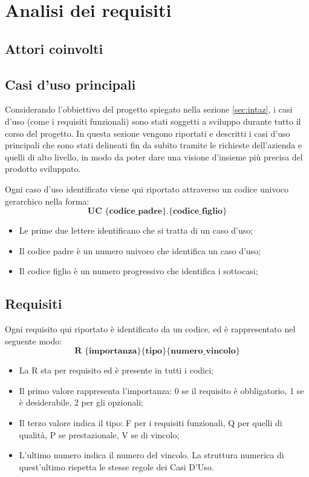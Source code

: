 
\chapter{Analisi dei requisiti}\label{chap:requirements}

\section{Attori coinvolti}
\section{Casi d'uso principali}
Considerando l'obbiettivo del progetto spiegato nella sezione \ref{sec:intaz}, i casi d'uso (come i requisiti funzionali) sono stati soggetti a sviluppo durante tutto il corso del progetto. In questa sezione vengono riportati e descritti i casi d'uso principali che sono stati delineati fin da subito tramite le richieste dell'azienda e quelli di alto livello, in modo da poter dare una visione d’insieme più precisa del prodotto sviluppato.

Ogni caso d'uso identificato viene qui riportato attraverso un codice univoco gerarchico nella forma:
$$ \textbf{UC \{codice\_padre\}.\{codice\_figlio\}  } $$
\begin{itemize}
	\item Le prime due lettere identificano che si tratta di un caso d'uso;
	\item Il codice padre è un numero univoco che identifica un caso d'uso;
	\item Il codice figlio è un numero progressivo che identifica i sottocasi;\\
\end{itemize}



\section{Requisiti}
Ogni requisito qui riportato è identificato da un codice, ed è rappresentato nel seguente modo:
$$ \textbf{R \{importanza\}\{tipo\}\{numero\_vincolo\} } $$

\begin{itemize}
	\item La R sta per requisito ed è presente in tutti i codici;
	\item Il primo valore rappresenta l'importanza: 0 se il requisito è obbligatorio, 1 se è desiderabile, 2 per gli opzionali;
	\item Il terzo valore indica il tipo: F per i requisiti funzionali, Q per quelli di qualità, P se prestazionale, V se di vincolo;
	\item L'ultimo numero indica il numero del vincolo. La struttura numerica di quest'ultimo rispetta le stesse regole dei Casi D'Uso.
\end{itemize}

